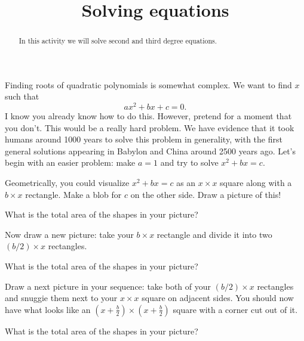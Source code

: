 \documentclass[nooutcomes]{ximera}
\title{Solving equations}
\begin{document}
\begin{abstract}
In this activity we will solve second and third degree equations.
\end{abstract}
\maketitle


Finding roots of quadratic polynomials is somewhat complex. We want to
find $x$ such that
\[
ax^2 + bx + c = 0.
\]
I know you already know how to do this. However, pretend for a moment
that you don't. This would be a really hard problem. We have evidence
that it took humans around 1000 years to solve this problem in
generality, with the first general solutions appearing in Babylon and China
around 2500 years ago. Let's begin with an easier problem: make $a=1$ and try to
solve $x^2 + bx = c$.
 

\begin{problem} Geometrically, you could visualize $x^2 + bx = c$ as an $x \times x$ square
along with a $b\times x$ rectangle. Make a blob for $c$ on the other side.  Draw a picture of this!
\end{problem}


\begin{question} What is the total area of the shapes in your picture?
\end{question}




\begin{problem} Now draw a new picture: take your $b\times x$ rectangle and divide it into two $(b/2)\times x$ rectangles.
\end{problem}


\begin{question} What is the total area of the shapes in your picture?
\end{question}

\begin{problem} Draw a next picture in your sequence: take both of your $(b/2)\times x$ rectangles and snuggie them
next to your $x\times x$ square on adjacent sides. You should now have
what looks like an $(x + \frac{b}{2}) \times (x +
\frac{b}{2})$ square with a corner cut out of it.
\end{problem}


\begin{question} What is the total area of the shapes in your picture?
\end{question}
\end{document}
